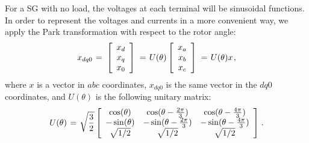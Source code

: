 \documentclass[letterpaper,10pt,conference]{ieeeconf}
\newcommand{\m}      {{\hbox{\hskip 1pt}}}
\begin{document}
For a SG with no load, the voltages at each terminal
will be sinusoidal functions. In order to represent the voltages and
currents in a more convenient way, we apply the Park transformation
with respect to the rotor angle:
$$ x_{dq0} \m=\m \left[\begin{array}{c} x_{d}\\ x_{q}\\ x_{0}
   \end{array}\right] \m=\m U(\theta) \left[\begin{array}{c} x_{a}\\
   x_b\\ x_c\end{array}\right] \m=\m U(\theta) x \m,$$
where $x$ is a vector in $abc$ coordinates, $x_{dq0}$
is the same vector in the $dq0$ coordinates, and $U(\theta)$ is the
following unitary matrix:
$$ U(\theta) \m=\m \sqrt{\frac{3}{2}}\left[\begin{array}{ccc}
   \cos(\theta) & \cos(\theta-\frac{2\pi}{3}) & \cos(\theta-
   \frac{4\pi}{3})\\ -\sin(\theta) & -\sin(\theta-\frac{2\pi}{3})
   & -\sin(\theta-\frac{4\pi}{3})\\ \sqrt{1/2} & \sqrt{1/2} & 
   \sqrt{1/2} \end{array}\right] \m.$$
\end{document}
